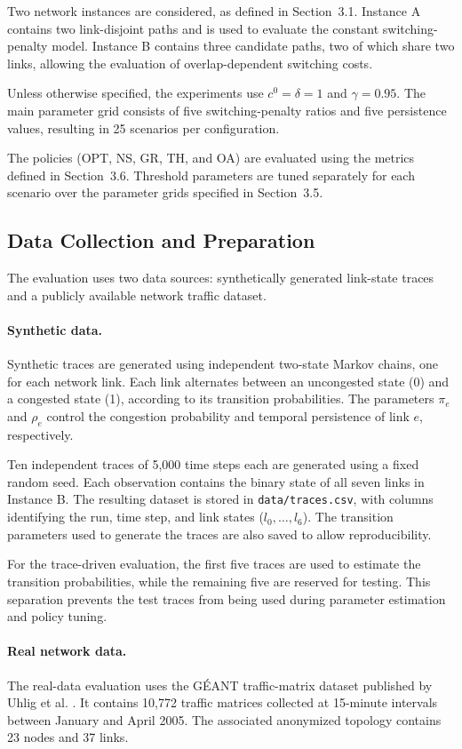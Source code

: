 \documentclass{amsart}
\begin{document}
Two network instances are considered, as defined in Section~3.1. Instance A contains two link-disjoint paths and is used to evaluate the constant switching-penalty model. Instance B contains three candidate paths, two of which share two links, allowing the evaluation of overlap-dependent switching costs.

Unless otherwise specified, the experiments use $c^0 = \delta = 1$ and $\gamma = 0.95$. The main parameter grid consists of five switching-penalty ratios and five persistence values, resulting in 25 scenarios per configuration.

The policies (OPT, NS, GR, TH, and OA) are evaluated using the metrics defined in Section~3.6. Threshold parameters are tuned separately for each scenario over the parameter grids specified in Section~3.5.
\subsection{Data Collection and Preparation}

The evaluation uses two data sources: synthetically generated link-state traces and a publicly available network traffic dataset.

\paragraph{Synthetic data.}
Synthetic traces are generated using independent two-state Markov chains, one for each network link. Each link alternates between an uncongested state (0) and a congested state (1), according to its transition probabilities. The parameters $\pi_e$ and $\rho_e$ control the congestion probability and temporal persistence of link $e$, respectively.

Ten independent traces of 5,000 time steps each are generated using a fixed random seed. Each observation contains the binary state of all seven links in Instance B. The resulting dataset is stored in \texttt{data/traces.csv}, with columns identifying the run, time step, and link states ($l_0,\ldots,l_6$). The transition parameters used to generate the traces are also saved to allow reproducibility.

For the trace-driven evaluation, the first five traces are used to estimate the transition probabilities, while the remaining five are reserved for testing. This separation prevents the test traces from being used during parameter estimation and policy tuning.

\paragraph{Real network data.}
The real-data evaluation uses the GÉANT traffic-matrix dataset published by Uhlig et al. \cite{uhlig2006}. It contains 10,772 traffic matrices collected at 15-minute intervals between January and April 2005. The associated anonymized topology contains 23 nodes and 37 links.
\end{document}
